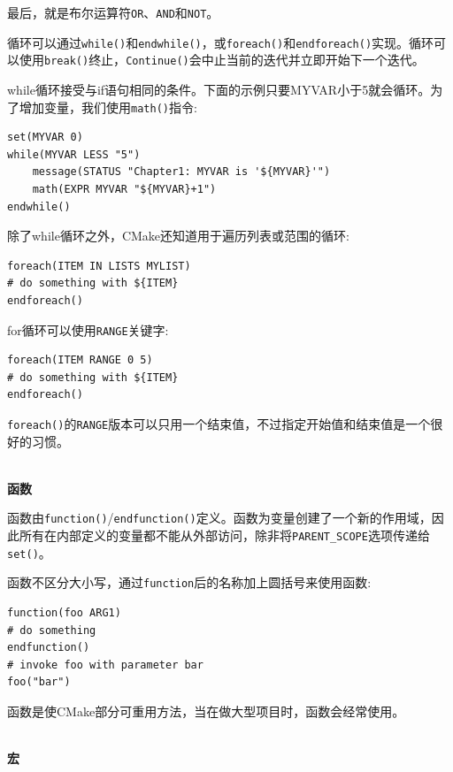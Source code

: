 最后，就是布尔运算符\texttt{OR}、\texttt{AND}和\texttt{NOT}。

循环可以通过\texttt{while()}和\texttt{endwhile()}，或\texttt{foreach()}和\texttt{endforeach()}实现。循环可以使用\texttt{break()}终止，\texttt{Continue()}会中止当前的迭代并立即开始下一个迭代。

while循环接受与if语句相同的条件。下面的示例只要MYVAR小于5就会循环。为了增加变量，我们使用\texttt{math()}指令:

\begin{lstlisting}[style=styleCMake]
set(MYVAR 0)
while(MYVAR LESS "5")
	message(STATUS "Chapter1: MYVAR is '${MYVAR}'")
	math(EXPR MYVAR "${MYVAR}+1")
endwhile()
\end{lstlisting}

除了while循环之外，CMake还知道用于遍历列表或范围的循环:

\begin{lstlisting}[style=styleCMake]
foreach(ITEM IN LISTS MYLIST)
# do something with ${ITEM}
endforeach()
\end{lstlisting}

for循环可以使用\texttt{RANGE}关键字:

\begin{lstlisting}[style=styleCMake]
foreach(ITEM RANGE 0 5)
# do something with ${ITEM}
endforeach()
\end{lstlisting}

\texttt{foreach()}的\texttt{RANGE}版本可以只用一个结束值，不过指定开始值和结束值是一个很好的习惯。

\hspace*{\fill} \\ %
\noindent
\textbf{函数}

函数由\texttt{function()}/\texttt{endfunction()}定义。函数为变量创建了一个新的作用域，因此所有在内部定义的变量都不能从外部访问，除非将\texttt{PARENT\_SCOPE}选项传递给\texttt{set()}。

函数不区分大小写，通过\texttt{function}后的名称加上圆括号来使用函数:

\begin{lstlisting}[style=styleCMake]
function(foo ARG1)
# do something
endfunction()
# invoke foo with parameter bar
foo("bar")
\end{lstlisting}

函数是使CMake部分可重用方法，当在做大型项目时，函数会经常使用。

\hspace*{\fill} \\ %
\noindent
\textbf{宏}

